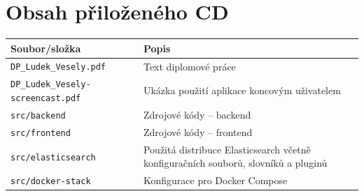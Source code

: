 \documentclass[FM,DP]{tulthesis}
\begin{document}
\chapter{Obsah přiloženého CD}


\begin{center}

\begin{tabular}{L{67mm} L{73mm}} 
\toprule
\textbf{Soubor/složka} & \textbf{Popis} \\
\midrule
\verb|DP_Ludek_Vesely.pdf| & Text diplomové práce\\
\hline
\verb|DP_Ludek_Vesely-screencast.pdf| & Ukázka použití aplikace koncovým uživatelem\\
\hline
\verb|src/backend| & Zdrojové kódy -- backend\\
\hline
\verb|src/frontend| & Zdrojové kódy -- frontend\\
\hline
\verb|src/elasticsearch| & Použitá distribuce Elasticsearch včetně konfiguračních souborů, slovníků a pluginů\\
\hline
\verb|src/docker-stack| & Konfigurace pro Docker Compose\\
\bottomrule
\end{tabular}

\end{center}


\end{document}
